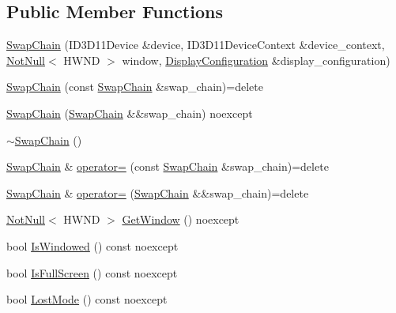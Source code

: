 \subsection*{Public Member Functions}
\begin{DoxyCompactItemize}
\item 
\hyperlink{classmage_1_1rendering_1_1_swap_chain_a711f0c9750a2ff68a71bb9e333b2eba7}{Swap\+Chain} (I\+D3\+D11\+Device \&device, I\+D3\+D11\+Device\+Context \&device\+\_\+context, \hyperlink{namespacemage_a8769f9d670d6b585ea306cb1062af94b}{Not\+Null}$<$ H\+W\+ND $>$ window, \hyperlink{classmage_1_1rendering_1_1_display_configuration}{Display\+Configuration} \&display\+\_\+configuration)
\item 
\hyperlink{classmage_1_1rendering_1_1_swap_chain_a55ca2b4722e40e0f23dcacfbce75f894}{Swap\+Chain} (const \hyperlink{classmage_1_1rendering_1_1_swap_chain}{Swap\+Chain} \&swap\+\_\+chain)=delete
\item 
\hyperlink{classmage_1_1rendering_1_1_swap_chain_ae6bc03d3e49c012ff4eab712cb97e248}{Swap\+Chain} (\hyperlink{classmage_1_1rendering_1_1_swap_chain}{Swap\+Chain} \&\&swap\+\_\+chain) noexcept
\item 
\hyperlink{classmage_1_1rendering_1_1_swap_chain_ae554cc85a11c0126c645263e8ffb1cf4}{$\sim$\+Swap\+Chain} ()
\item 
\hyperlink{classmage_1_1rendering_1_1_swap_chain}{Swap\+Chain} \& \hyperlink{classmage_1_1rendering_1_1_swap_chain_a44dfcabbd320aad76853522bd084d181}{operator=} (const \hyperlink{classmage_1_1rendering_1_1_swap_chain}{Swap\+Chain} \&swap\+\_\+chain)=delete
\item 
\hyperlink{classmage_1_1rendering_1_1_swap_chain}{Swap\+Chain} \& \hyperlink{classmage_1_1rendering_1_1_swap_chain_a815e4c6a4dfa149c4c3218f274c1850b}{operator=} (\hyperlink{classmage_1_1rendering_1_1_swap_chain}{Swap\+Chain} \&\&swap\+\_\+chain)=delete
\item 
\hyperlink{namespacemage_a8769f9d670d6b585ea306cb1062af94b}{Not\+Null}$<$ H\+W\+ND $>$ \hyperlink{classmage_1_1rendering_1_1_swap_chain_ab140a96957564646ec81eabaa6ea7522}{Get\+Window} () noexcept
\item 
bool \hyperlink{classmage_1_1rendering_1_1_swap_chain_a7059719bc0f821baada358534b935778}{Is\+Windowed} () const noexcept
\item 
bool \hyperlink{classmage_1_1rendering_1_1_swap_chain_aa5643411827a2eccd04e46368193b762}{Is\+Full\+Screen} () const noexcept
\item 
bool \hyperlink{classmage_1_1rendering_1_1_swap_chain_a8d4356d1652fca65095bc4db2bd0c1f2}{Lost\+Mode} () const noexcept

\end{DoxyCompactItemize}
